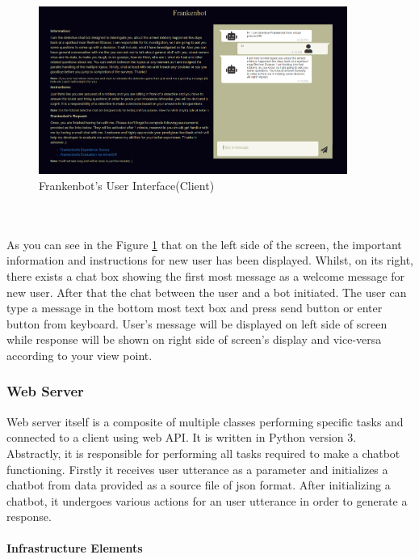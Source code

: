 \begin{figure}[!h]
    \centering
    \includegraphics[width=0.9\textwidth]{img/User_Interface.PNG}
    \caption{Frankenbot's User Interface(Client)}
    \label{fig:userInter}
\end{figure}
\\~\\
As you can see in the Figure \ref{fig:userInter} that  on the left side of the screen, the important information and instructions for new user has been displayed. Whilst, on its right, there exists a chat box showing the first most message as a welcome message for new user. After that the chat between the user and a bot initiated. The user can type a message in the bottom most text box and press send button or enter button from keyboard. User's message will be displayed on left side of screen while response will be shown on right side of screen's display and vice-versa according to your view point.

\subsubsection*{Web Server}
Web server itself is a composite of multiple classes performing specific tasks and connected to a client using web API. It is written in Python version 3. Abstractly, it is responsible for performing all tasks required to make a chatbot functioning. Firstly it receives user utterance as a parameter and initializes a chatbot from data provided as a source file of json format. After initializing a chatbot, it undergoes various actions for an user utterance in order to generate a response.

\paragraph*{Infrastructure Elements}

